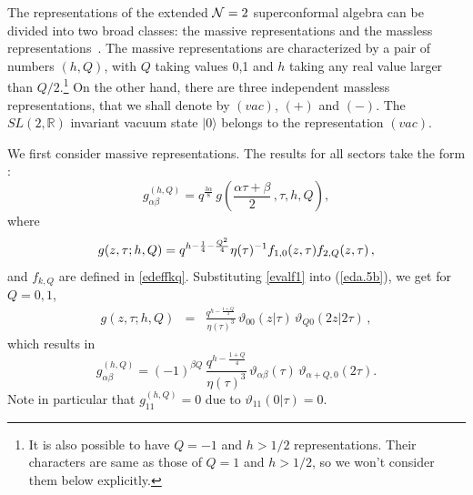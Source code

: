 \documentclass[12pt,a4paper]{article}
\newcommand{\be}{\begin{equation}}
\newcommand{\ee}{\end{equation}}
\newcommand{\ben}{\begin{eqnarray}\displaystyle}
\newcommand{\een}{\end{eqnarray}}
\newcommand{\refb}[1]{(\ref{#1})}
\def\RRR{{\hbox{ R\kern-2.4mm R}}}
\def\RRR{{\mathbb R} }
\def\({\left(}
\def\){\right)}
\newcommand{\vt}{\vartheta}
\newcommand{\NN}{{\cal N}}
\def\ghQ{g^{(h,Q)}}
\begin{document}
The representations of the extended $\NN=2$ superconformal algebra can be divided into two broad
classes: the massive representations and the massless
representations~\cite{Odake:1989dm,Odake:1989ev}. The massive
representations are characterized by a pair of numbers $(h,Q)$,
with $Q$ taking values 0,1 and $h$
taking any real value larger than $Q/2$.\footnote{It is also possible to have $Q=-1$ and $h>1/2$ representations.
Their characters are same as those of $Q=1$ and $h>1/2$, so we won't consider them below explicitly.}
On the other hand, there are three independent
massless representations, that we shall denote by $(vac)$, $(+)$ and $(-)$.
The $SL(2,\RRR)$ invariant vacuum state $|0\rangle$ belongs to the representation $(vac)$.

We first consider massive representations.  The results for all sectors take the form \cite{Odake:1989ev}:
\be
\ghQ_{\alpha\beta}=q^{\frac{3\alpha}{8}}\, g\(\frac{\alpha\tau+\beta}{2}\, ,\tau, h,Q\),
\label{eda.5a}
\ee
where
\be\label{eda.5b}
g(z,\tau; h,Q) = q^{h-{1\over 4} -{Q^2\over 4}} \eta(\tau)^{-1} f_{1,0}(z,\tau) f_{2,Q}(z,\tau)\, ,
\ee
and $f_{k,Q}$ are defined in \eqref{edeffkq}.
Substituting \eqref{evalf1} into \refb{eda.5b}, we get for $Q=0,1$,
\ben
g(z,\tau;h,Q)
&=&   \frac{q^{h-\frac{1+Q}{4}}  }{\eta(\tau)^3}\, \vt_{00}(z|\tau)\, \vt_{Q0}(2z|2\tau)\, ,
\label{edd.11new}
\een
which results in
\be
\ghQ_{\alpha\beta}=(-1)^{\beta Q}\, \frac{q^{h-\frac{1+Q}{4}} }{\eta(\tau)^3}\,
\vt_{\alpha\beta}(\tau)\, \vt_{\alpha+Q,0}(2\tau).
\label{gab}
\ee
Note in particular that $\ghQ_{11}=0$ due to $\vt_{11}(0|\tau)=0$.
\end{document}
